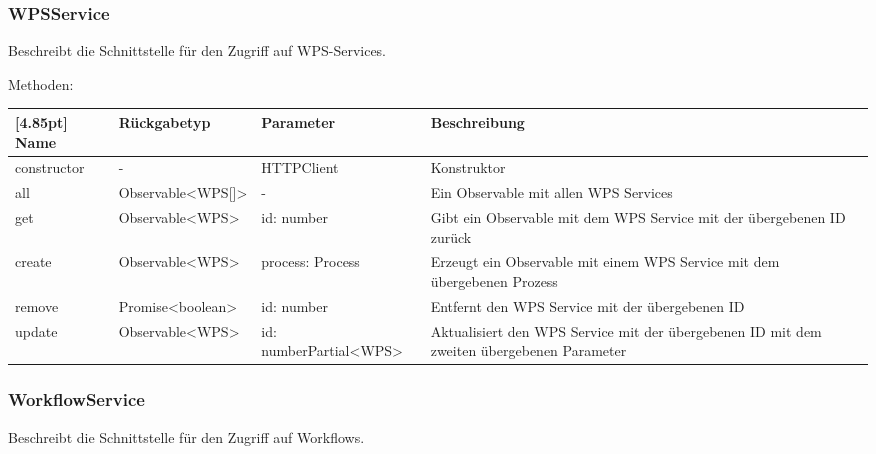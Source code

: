 			
			\subsubsection{WPSService}
			
			Beschreibt die Schnittstelle für den Zugriff auf WPS-Services.\newline
			
			Methoden:
			\begin{center}
			\setlength\tabcolsep{5pt}
				\renewcommand{\arraystretch}{1.5}
					\begin{tabularx}{\textwidth}{|l|l|p{35mm}|X|}
					\hline
					\rowcolor[gray]{0.75}[4.85pt]
					Name & Rückgabetyp & Parameter & Beschreibung \\ \hline 
					constructor & - & HTTPClient & Konstruktor\\ \hline
					all & Observable<WPS[]> & - & Ein Observable mit allen WPS Services\\ \hline
					get & Observable<WPS> & id: number & Gibt ein Observable mit dem WPS Service mit der übergebenen ID zurück \\ \hline
					create & Observable<WPS> & process: Process & Erzeugt ein Observable mit einem WPS Service mit dem übergebenen Prozess \\ \hline
					remove & Promise<boolean> & id: number & Entfernt den WPS Service mit der übergebenen ID \\ \hline
					update & Observable<WPS> & id: number\newline Partial<WPS> & Aktualisiert den WPS Service mit der übergebenen ID mit dem zweiten übergebenen Parameter \\ \hline
					\end{tabularx}
			\end{center}
			
			\subsubsection{WorkflowService}
			
			Beschreibt die Schnittstelle für den Zugriff auf Workflows.\newline
				
